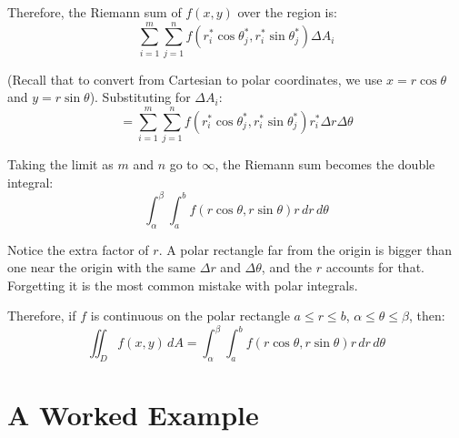 Therefore, the Riemann sum of $f(x,y)$ over the region is:
$$\sum_{i = 1}^m \sum_{j = 1}^n f(r_i^* \cos{\theta_j^*}, r_i^* \sin{\theta_j^*
}) \Delta A_i$$

(Recall that to convert from Cartesian to polar coordinates, we use $x = r\cos{
\theta}$ and $y = r\sin{\theta}$). Substituting for $\Delta A_i$:
$$= \sum_{i = 1}^m \sum_{j = 1}^n f(r_i^* \cos{\theta_j^*}, r_i^* \sin{\theta_j
^*}) r_i^* \Delta r \Delta \theta$$

Taking the limit as $m$ and $n$ go to $\infty$, the Riemann sum becomes the double integral:
$$\int_{\alpha}^{\beta} \int_a^b f(r\cos{\theta}, r\sin{\theta}) r\,dr\,d
\theta$$

Notice the extra factor of $r$. A polar rectangle far from the origin is
bigger than one near the origin with the same $\Delta r$ and $\Delta\theta$, and
the $r$ accounts for that. Forgetting it is the most common mistake with polar
integrals.

Therefore, if $f$ is continuous on the polar rectangle $a \leq r \leq b$, 
$\alpha \leq \theta \leq \beta$, then:
$$\iint_{\textit{D}} f(x,y)\,dA = \int_{\alpha}^{\beta} \int_a^b f(r\cos{\theta
}, r\sin{\theta})r\,dr\,d\theta$$

\section{A Worked Example}

